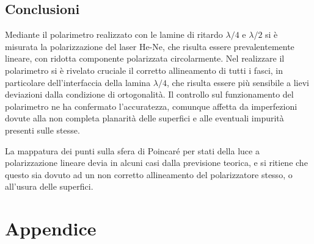 \documentclass[10pt,oneside,a4paper]{article}
\begin{document}
\begin{multicols}{2}
\section{Conclusioni}
Mediante il polarimetro realizzato con le lamine di ritardo $\lambda / 4$ e $\lambda / 2$ si è misurata la polarizzazione del laser He-Ne, che risulta essere prevalentemente lineare, con ridotta componente polarizzata circolarmente. Nel realizzare il polarimetro si è rivelato cruciale il corretto allineamento di tutti i fasci, in particolare dell'interfaccia della lamina $\lambda / 4$, che risulta essere più sensibile a lievi deviazioni dalla condizione di ortogonalità. Il controllo sul funzionamento del polarimetro ne ha confermato l'accuratezza, comunque affetta da imperfezioni dovute alla non completa planarità delle superfici e alle eventuali impurità presenti sulle stesse.

La mappatura dei punti sulla sfera di Poincaré per stati della luce a polarizzazione lineare devia in alcuni casi dalla previsione teorica, e si ritiene che questo sia dovuto ad un non corretto allineamento del polarizzatore stesso, o all'usura delle superfici.

\end{multicols}


\newpage
\section{Appendice}
\end{document}
